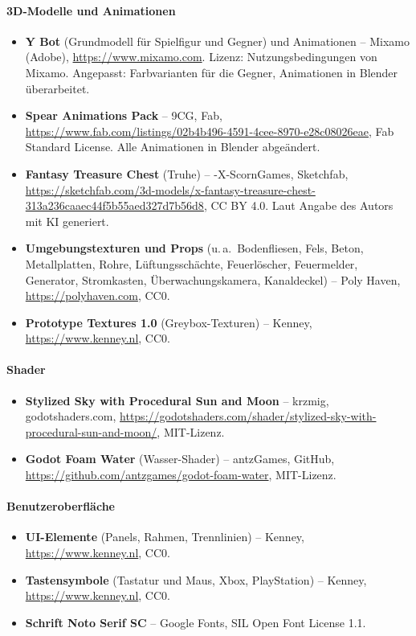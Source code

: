 \documentclass[../Main.tex]{subfiles}
\begin{document}
\paragraph{3D-Modelle und Animationen}
\begin{itemize}[leftmargin=1.5cm]
\item \textbf{Y Bot} (Grundmodell für Spielfigur und Gegner) und Animationen -- Mixamo (Adobe), \url{https://www.mixamo.com}. Lizenz: Nutzungsbedingungen von Mixamo. Angepasst: Farbvarianten für die Gegner, Animationen in Blender überarbeitet.
\item \textbf{Spear Animations Pack} -- 9CG, Fab, \url{https://www.fab.com/listings/02b4b496-4591-4cee-8970-e28c08026eae}, Fab Standard License. Alle Animationen in Blender abgeändert.
\item \textbf{Fantasy Treasure Chest} (Truhe) -- -X-ScornGames, Sketchfab, \url{https://sketchfab.com/3d-models/x-fantasy-treasure-chest-313a236caaec44f5b55aed327d7b56d8}, CC BY 4.0. Laut Angabe des Autors mit KI generiert.
\item \textbf{Umgebungstexturen und Props} (u.\,a.\ Bodenfliesen, Fels, Beton, Metallplatten, Rohre, Lüftungsschächte, Feuerlöscher, Feuermelder, Generator, Stromkasten, Überwachungskamera, Kanaldeckel) -- Poly Haven, \url{https://polyhaven.com}, CC0.
\item \textbf{Prototype Textures 1.0} (Greybox-Texturen) -- Kenney, \url{https://www.kenney.nl}, CC0.
\end{itemize}

\paragraph{Shader}
\begin{itemize}[leftmargin=1.5cm]
\item \textbf{Stylized Sky with Procedural Sun and Moon} -- krzmig, godotshaders.com, \url{https://godotshaders.com/shader/stylized-sky-with-procedural-sun-and-moon/}, MIT-Lizenz.
\item \textbf{Godot Foam Water} (Wasser-Shader) -- antzGames, GitHub, \url{https://github.com/antzgames/godot-foam-water}, MIT-Lizenz.
\end{itemize}

\paragraph{Benutzeroberfläche}
\begin{itemize}[leftmargin=1.5cm]
\item \textbf{UI-Elemente} (Panels, Rahmen, Trennlinien) -- Kenney, \url{https://www.kenney.nl}, CC0.
\item \textbf{Tastensymbole} (Tastatur und Maus, Xbox, PlayStation) -- Kenney, \url{https://www.kenney.nl}, CC0.
\item \textbf{Schrift Noto Serif SC} -- Google Fonts, SIL Open Font License 1.1.
\end{itemize}
\end{document}

